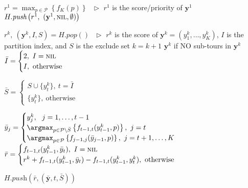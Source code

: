 \begin{algorithm}[htbp]
\begin{algorithmic}[1]
\STATE $r^1 = \max_{p \in \mathcal{P}} \left\{ f_K(p) \right\}~~~ \triangleright$ $r^1$ is the score/priority of $\mathbf{y}^1$
\STATE $H.\textit{push}\left(r^1,~ (\mathbf{y}^1, \textsc{nil}, \emptyset) \right)$

    \STATE $r^k,~ (\mathbf{y}^k, I, S) = H.\textit{pop}()~~~ \triangleright$ 
           $r^k$ is the score of $\mathbf{y}^k=(y_1^k,\dots,y_K^k)$, $I$ is the partition index, and $S$ is the exclude set
    \STATE $k = k + 1$
    \RETURN $\mathbf{y}^k$ if NO sub-tours in $\mathbf{y}^k$
    \STATE $\bar{I} = \begin{cases}
                      2,~ I = \textsc{nil} \\
                      I,~ \text{otherwise}
                      \end{cases}$

        \STATE $\bar{S} = \begin{cases}
                          S \cup \{ y_t^k \},~ t = \bar{I} \\
                          \{ y_t^k \},~ \text{otherwise}
                          \end{cases}$

        \STATE $\bar{y}_j = \begin{cases}
                            y_j^k,~~ j=1,\dots,t-1 \\
                            \argmax_{p \in \mathcal{P} \setminus \bar{S}} \left\{ f_{t-1,t}(y_{t-1}^k, p) \right\},~ j=t \\
                            \argmax_{p \in \mathcal{P}} \left\{ f_{j-1, j}(\bar{y}_{j-1}, p) \right\},~ j=t+1,\dots,K
                \end{cases}$
        \STATE $\bar{r} = \begin{cases}
                          f_{t-1,t}(y_{t-1}^k, \bar{y}_t),~ I = \textsc{nil} \\
                          r^k + f_{t-1,t}(y_{t-1}^k, \bar{y}_t) - f_{t-1,t}(y_{t-1}^k, y_t^k),~ \text{otherwise}
                          \end{cases}$

        $H.\textit{push}\left(\bar{r}, (\bar{\mathbf{y}}, t, \bar{S}) \right)$
    \ENDFOR
\ENDWHILE
\end{algorithmic}
\end{algorithm}



